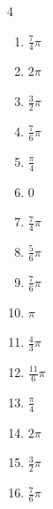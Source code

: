 \begin{multicols}{4}
\begin{enumerate}
  \item $\displaystyle \frac{7}{4}\pi$

  \item $\displaystyle 2\pi$

  \item $\displaystyle \frac{3}{2}\pi$

  \item $\displaystyle \frac{7}{6}\pi$

  \item $\displaystyle \frac{\pi}{4}$

  \item $\displaystyle 0$

  \item $\displaystyle \frac{7}{4}\pi$

  \item $\displaystyle \frac{5}{6}\pi$

  \item $\displaystyle \frac{7}{6}\pi$

  \item $\displaystyle \pi$

  \item $\displaystyle \frac{4}{3}\pi$

  \item $\displaystyle \frac{11}{6}\pi$

  \item $\displaystyle \frac{\pi}{4}$

\columnbreak %

\resetques

  \item $\displaystyle 2\pi$

  \item $\displaystyle \frac{3}{2}\pi$

  \item $\displaystyle \frac{7}{6}\pi$


\end{enumerate}
\end{multicols}
